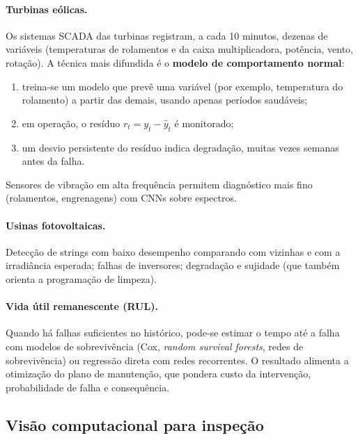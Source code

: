 \documentclass[11pt,a4paper]{article}
\begin{document}
\paragraph{Turbinas eólicas.} Os sistemas SCADA das turbinas registram, a cada
10 minutos, dezenas de variáveis (temperaturas de rolamentos e da caixa
multiplicadora, potência, vento, rotação). A técnica mais difundida é o
\textbf{modelo de comportamento normal}:
\begin{enumerate}
  \item treina-se um modelo que prevê uma variável (por exemplo, temperatura
    do rolamento) a partir das demais, usando apenas períodos saudáveis;
  \item em operação, o resíduo $r_t = y_t - \hat{y}_t$ é monitorado;
  \item um desvio persistente do resíduo indica degradação, muitas vezes
    semanas antes da falha.
\end{enumerate}
Sensores de vibração em alta frequência permitem diagnóstico mais fino
(rolamentos, engrenagens) com CNNs sobre espectros.

\paragraph{Usinas fotovoltaicas.} Detecção de strings com baixo desempenho
comparando com vizinhas e com a irradiância esperada; falhas de inversores;
degradação e sujidade (que também orienta a programação de limpeza).

\paragraph{Vida útil remanescente (RUL).} Quando há falhas suficientes no
histórico, pode-se estimar o tempo até a falha com modelos de sobrevivência
(Cox, \textit{random survival forests}, redes de sobrevivência) ou regressão
direta com redes recorrentes. O resultado alimenta a otimização do plano de
manutenção, que pondera custo da intervenção, probabilidade de falha e
consequência.

\subsection{Visão computacional para inspeção}
\end{document}
